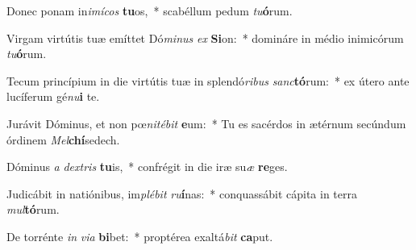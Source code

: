 \item Donec ponam in\textit{i}\textit{mí}\textit{cos} \textbf{tu}os,~* scabéllum pedum \textit{tu}\textbf{ó}rum.
\item Virgam virtútis tuæ emíttet Dó\textit{mi}\textit{nus} \textit{ex} \textbf{Si}on:~* domináre in médio inimicórum \textit{tu}\textbf{ó}rum.
\item Tecum princípium in die virtútis tuæ in splendó\textit{ri}\textit{bus} \textit{sanc}\textbf{tó}rum:~* ex útero ante lucíferum gé\textit{nu}\textbf{i} te.
\item Jurávit Dóminus, et non pœ\textit{ni}\textit{té}\textit{bit} \textbf{e}um:~* Tu es sacérdos in ætérnum secúndum órdinem \textit{Mel}\textbf{chí}sedech.
\item Dóminus \textit{a} \textit{dex}\textit{tris} \textbf{tu}is,~* confrégit in die iræ su\textit{æ} \textbf{re}ges.
\item Judicábit in natiónibus, im\textit{plé}\textit{bit} \textit{ru}\textbf{í}nas:~* conquassábit cápita in terra \textit{mul}\textbf{tó}rum.
\item De torrénte \textit{in} \textit{vi}\textit{a} \textbf{bi}bet:~* proptérea exaltá\textit{bit} \textbf{ca}put.
